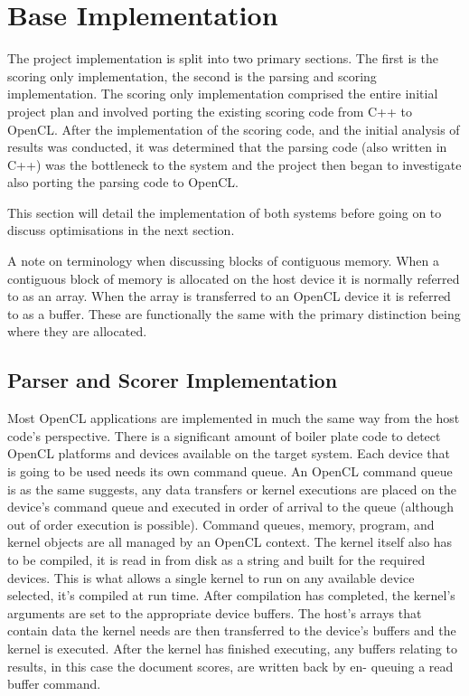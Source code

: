 \section{Base Implementation}

The project implementation is split into two primary sections. The first is the
scoring only implementation, the second is the parsing and scoring
implementation. The scoring only implementation comprised the entire initial
project plan and involved porting the existing scoring code from C++ to OpenCL.
After the implementation of the scoring code, and the initial analysis of
results was conducted, it was determined that the parsing code (also written in
C++) was the bottleneck to the system and the project then began to investigate
also porting the parsing code to OpenCL.

This section will detail the implementation of both systems before going on to
discuss optimisations in the next section.

A note on terminology when discussing blocks of contiguous memory. When a
contiguous block of memory is allocated on the host device it is normally
referred to as an array. When the array is transferred to an OpenCL device it is
referred to as a buffer. These are functionally the same with the primary
distinction being where they are allocated.

\subsection{Parser and Scorer Implementation}

Most OpenCL applications are implemented in much the same way from the host
code's perspective. There is a significant amount of boiler plate code to detect
OpenCL platforms and devices available on the target system. Each device that is
going to be used needs its own command queue. An OpenCL command queue is as the
same suggests, any data transfers or kernel executions are placed on the
device's command queue and executed in order of arrival to the queue (although
out of order execution is possible). Command queues, memory, program, and kernel
objects are all managed by an OpenCL context. The kernel itself also has to be
compiled, it is read in from disk as a string and built for the required
devices. This is what allows a single kernel to run on any available device
selected, it's compiled at run time. After compilation has completed, the
kernel's arguments are set to the appropriate device buffers. The host's arrays
that contain data the kernel needs are then transferred to the device's buffers
and the kernel is executed. After the kernel has finished executing, any buffers
relating to results, in this case the document scores, are written back by en-
queuing a read buffer command.

